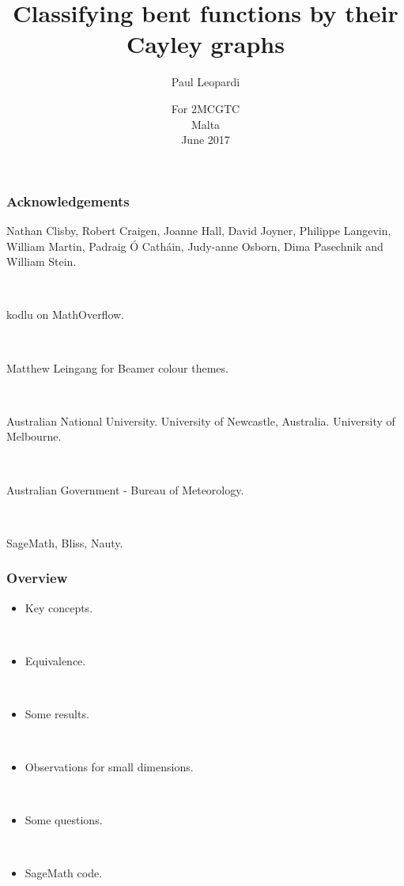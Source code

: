 \documentclass[pdf,sprung,slideColor,nocolorBG]{beamer}
\title{Classifying bent functions by their Cayley graphs}
\author{Paul Leopardi}
\date{For 2MCGTC
\\
Malta
\\
June 2017}
\institute{University of Melbourne
\\
Australian Government - Bureau of Meteorology}
\begin{document}
\frame{\titlepage}
\begin{frame}
\frametitle{Acknowledgements}
\begin{center}
Nathan Clisby,
Robert Craigen,
Joanne Hall,
David Joyner, Philippe Langevin, William Martin,
Padraig {\'O} Cath{\'a}in,
Judy-anne Osborn, Dima Pasechnik and William Stein.

~

kodlu on MathOverflow.

~

Matthew Leingang for Beamer colour themes.

~

Australian National University. University of Newcastle, Australia. University of Melbourne.

~

Australian Government - Bureau of Meteorology.

~

SageMath, Bliss, Nauty.
\end{center}
\end{frame}

\begin{frame}
\frametitle{Overview}
\begin{itemize}
\item
Key concepts.

~

\item
Equivalence.

~

\item
Some results.

~

\item
Observations for small dimensions.

~

\item
Some questions.

~

\item
SageMath code.
\end{itemize}

\end{frame}
\end{document}
